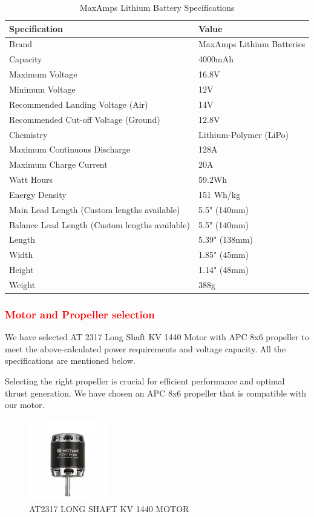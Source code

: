 \documentclass[12 pt]{article}
\begin{document}
\begin{table}[h]
    \centering
    \caption{MaxAmps Lithium Battery Specifications}
    \begin{tabular}{|l|l|}
    \hline
    \textbf{Specification} & \textbf{Value} \\ \hline
    Brand & MaxAmps Lithium Batteries \\
    Capacity & 4000mAh \\
    Maximum Voltage & 16.8V \\
    Minimum Voltage & 12V \\
    Recommended Landing Voltage (Air) & 14V \\
    Recommended Cut-off Voltage (Ground) & 12.8V \\
    Chemistry & Lithium-Polymer (LiPo) \\
    Maximum Continuous Discharge & 128A \\
    Maximum Charge Current & 20A \\
    Watt Hours & 59.2Wh \\
    Energy Density & 151 Wh/kg \\
    Main Lead Length (Custom lengths available) & 5.5" (140mm) \\
    Balance Lead Length (Custom lengths available) & 5.5" (140mm) \\
    Length & 5.39" (138mm) \\
    Width & 1.85" (45mm) \\
    Height & 1.14" (48mm) \\
    Weight & 388g \\ \hline
    \end{tabular}
\end{table}

\subsubsection{\textcolor{red}{Motor and Propeller selection}}

We have selected AT 2317 Long Shaft KV 1440 Motor with APC 8x6 propeller to meet the above-calculated power requirements and voltage capacity. All the specifications are mentioned below.

Selecting the right propeller is crucial for efficient performance and optimal thrust generation. We have chosen an APC 8x6 propeller that is compatible with our motor.

\begin{figure}[h]
    \centering
    \includegraphics[width=0.3\textwidth]{motorr.jpg}
    \caption{AT2317 LONG SHAFT KV 1440 MOTOR}
    \label{fig:motor}
\end{figure}
\end{document}

